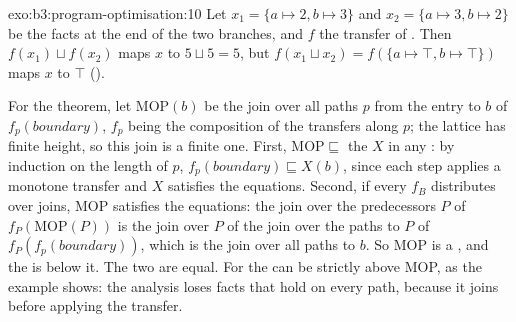 \begin{solution}{exo:b3:program-optimisation:10}
Let $x_1 = \{a \mapsto 2, b \mapsto 3\}$ and $x_2 = \{a \mapsto 3, b \mapsto 2\}$ be the facts at the end of the two branches, and $f$ the transfer of . Then $f(x_1) \sqcup f(x_2)$ maps $x$ to $5 \sqcup 5 = 5$, but $f(x_1 \sqcup x_2) = f(\{a \mapsto \top, b \mapsto \top\})$ maps $x$ to $\top$ ().

For the theorem, let $\mathrm{MOP}(b)$ be the join over all paths $p$ from the entry to $b$ of $f_p(\mathit{boundary})$, $f_p$ being the composition of the transfers along $p$; the lattice has finite height, so this join is a finite one. First, $\mathrm{MOP} \sqsubseteq$ the  $X$ in any : by induction on the length of $p$, $f_p(\mathit{boundary}) \sqsubseteq X(b)$, since each step applies a monotone transfer and $X$ satisfies the equations. Second, if every $f_B$ distributes over joins, MOP satisfies the equations: the join over the predecessors $P$ of $f_P(\mathrm{MOP}(P))$ is the join over $P$ of the join over the paths to $P$ of $f_P(f_p(\mathit{boundary}))$, which is the join over all paths to $b$. So MOP is a , and the  is below it. The two are equal. For  the  can be strictly above MOP, as the example shows: the analysis loses facts that hold on every path, because it joins before applying the transfer.
\end{solution}

